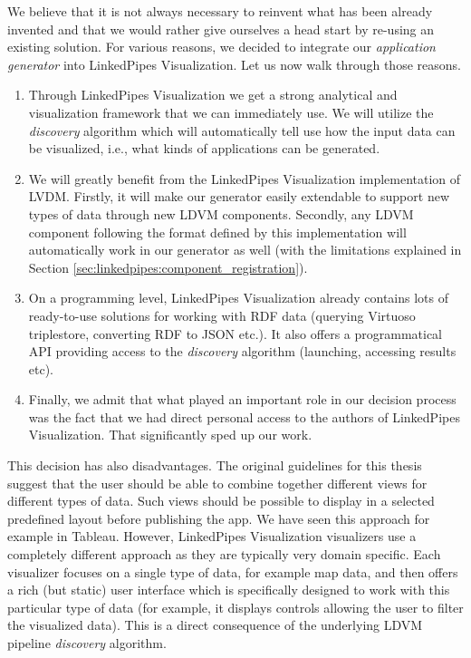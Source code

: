 We believe that it is not always necessary to reinvent what has been already invented and that we would rather give ourselves a head start by re-using an existing solution. For various reasons, we decided to integrate our \emph{application generator} into LinkedPipes Visualization. Let us now walk through those reasons.

\begin{enumerate}
\item Through LinkedPipes Visualization we get a strong analytical and visualization framework that we can immediately use. We will utilize the \emph{discovery} algorithm which will automatically tell use how the input data can be visualized, i.e., what kinds of applications can be generated.
\item We will greatly benefit from the LinkedPipes Visualization implementation of LVDM. Firstly, it will make our generator easily extendable to support new types of data through new LDVM components. Secondly, any LDVM component following the format defined by this implementation will automatically work in our generator as well (with the limitations explained in Section \ref{sec:linkedpipes:component_registration}).
\item On a programming level, LinkedPipes Visualization already contains lots of ready-to-use solutions for working with RDF data (querying Virtuoso triplestore, converting RDF to JSON etc.). It also offers a programmatical API providing access to the \emph{discovery} algorithm (launching, accessing results etc).
\item Finally, we admit that what played an important role in our decision process was the fact that we had direct personal access to the authors of LinkedPipes Visualization. That significantly sped up our work.

\end{enumerate}
This decision has also disadvantages. The original guidelines for this thesis suggest that the user should be able to combine together different views for different types of data. Such views should be possible to display in a selected predefined layout before publishing the app. We have seen this approach for example in Tableau. However, LinkedPipes Visualization visualizers use a completely different approach as they are typically very domain specific. Each visualizer focuses on a single type of data, for example map data, and then offers a rich (but static) user interface which is specifically designed to work with this particular type of data (for example, it displays controls allowing the user to filter the visualized data). This is a direct consequence of the underlying LDVM pipeline \emph{discovery} algorithm.

